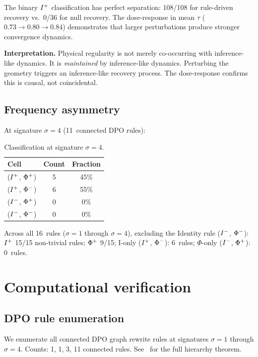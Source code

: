 \documentclass{../shared/primo}
\begin{document}
The binary $I\textsuperscript{+}$ classification has perfect separation: 108/108 for rule-driven recovery vs.\ 0/36 for null recovery. The dose-response in mean $\tau$ ($0.73 \to 0.80 \to 0.84$) demonstrates that larger perturbations produce stronger convergence dynamics.

\textbf{Interpretation.} Physical regularity is not merely co-occurring with inference-like dynamics. It is \emph{maintained} by inference-like dynamics. Perturbing the geometry triggers an inference-like recovery process. The dose-response confirms this is causal, not coincidental.

\subsection{Frequency asymmetry}

At signature $\sigma = 4$ (11~connected DPO rules):

\begin{table}[ht]
\centering
\begin{tabular}{lcc}
\toprule
Cell & Count & Fraction \\
\midrule
($I\textsuperscript{+}$, $\Phi\textsuperscript{+}$) & 5 & 45\% \\
($I\textsuperscript{+}$, $\Phi\textsuperscript{$-$}$) & 6 & 55\% \\
($I\textsuperscript{$-$}$, $\Phi\textsuperscript{+}$) & 0 & 0\% \\
($I\textsuperscript{$-$}$, $\Phi\textsuperscript{$-$}$) & 0 & 0\% \\
\bottomrule
\end{tabular}
\caption{Classification at signature $\sigma = 4$.}
\label{tab:sigma4}
\end{table}

Across all 16~rules ($\sigma = 1$ through $\sigma = 4$), excluding the Identity rule ($I\textsuperscript{$-$}$, $\Phi\textsuperscript{$-$}$): $I\textsuperscript{+}$ 15/15 non-trivial rules; $\Phi\textsuperscript{+}$ 9/15; I-only ($I\textsuperscript{+}$, $\Phi\textsuperscript{$-$}$): 6~rules; $\Phi$-only ($I\textsuperscript{$-$}$, $\Phi\textsuperscript{+}$): 0~rules.


\section{Computational verification}
\label{sec:verification}

\subsection{DPO rule enumeration}

We enumerate all connected DPO graph rewrite rules at signatures $\sigma = 1$ through $\sigma = 4$. Counts: 1, 1, 3, 11 connected rules. See~\cite{kowalczyk2026hierarchy} for the full hierarchy theorem.
\end{document}
